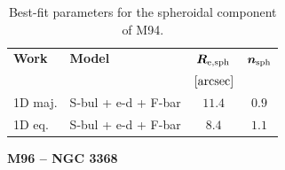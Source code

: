 \documentclass[preprint2]{emulateapj}
\begin{document}
  \begin{table}[h]
  \small
  \caption{Best-fit parameters for the spheroidal component of M94.}
  \begin{center}
  \begin{tabular}{llcc}
  \hline
  {\bf Work} & {\bf Model}   & $\bm R_{\rm e,sph}$    & $\bm n_{\rm sph}$ \\
    &  &  $[\rm arcsec]$ & \\
  \hline
  1D maj. & S-bul + e-d + F-bar & $11.4$  &  $0.9$ \\
  1D eq.  & S-bul + e-d + F-bar & $8.4$   &  $1.1$ \\
  \hline
  \end{tabular}
  \end{center}
  \label{tab:m94}
  \end{table}


  \clearpage\newpage\noindent
  {\bf M96 -- NGC 3368 \\}
\end{document}
